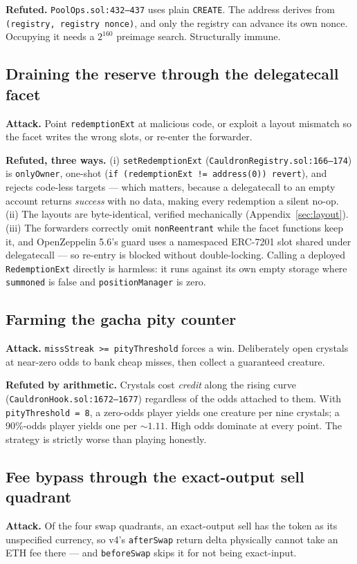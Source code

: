 \documentclass[11pt,a4paper]{article}
\newcommand{\code}[1]{\texttt{\small #1}}
\newcommand{\fileref}[1]{\texttt{\scriptsize #1}}
\begin{document}
\textbf{Refuted.} \fileref{PoolOps.sol:432--437} uses plain \code{CREATE}. The
address derives from \code{(registry, registry nonce)}, and only the registry can
advance its own nonce. Occupying it needs a $2^{160}$ preimage search.
\textcolor{good}{Structurally immune.}

\subsection*{Draining the reserve through the delegatecall facet}
\textbf{Attack.} Point \code{redemptionExt} at malicious code, or exploit a
layout mismatch so the facet writes the wrong slots, or re-enter the forwarder.

\textbf{Refuted, three ways.} (i) \code{setRedemptionExt}
(\fileref{CauldronRegistry.sol:166--174}) is \code{onlyOwner}, one-shot
(\code{if (redemptionExt != address(0)) revert}), and rejects code-less targets ---
which matters, because a delegatecall to an empty account returns \emph{success}
with no data, making every redemption a silent no-op. (ii) The layouts are
byte-identical, verified mechanically (Appendix~\ref{sec:layout}). (iii) The
forwarders correctly omit \code{nonReentrant} while the facet functions keep it,
and OpenZeppelin 5.6's guard uses a namespaced ERC-7201 slot shared under
delegatecall --- so re-entry is blocked without double-locking. Calling a deployed
\code{RedemptionExt} directly is harmless: it runs against its own empty storage
where \code{summoned} is false and \code{positionManager} is zero.

\subsection*{Farming the gacha pity counter}
\textbf{Attack.} \code{missStreak >= pityThreshold} forces a win. Deliberately
open crystals at near-zero odds to bank cheap misses, then collect a guaranteed
creature.

\textbf{Refuted by arithmetic.} Crystals cost \emph{credit} along the rising curve
(\fileref{CauldronHook.sol:1672--1677}) regardless of the odds attached to them.
With \code{pityThreshold = 8}, a zero-odds player yields one creature per nine
crystals; a 90\%-odds player yields one per ${\sim}1.11$. High odds dominate at
every point. The strategy is strictly worse than playing honestly.

\subsection*{Fee bypass through the exact-output sell quadrant}
\textbf{Attack.} Of the four swap quadrants, an exact-output sell has the token as
its unspecified currency, so v4's \code{afterSwap} return delta physically cannot
take an ETH fee there --- and \code{beforeSwap} skips it for not being exact-input.
\end{document}
